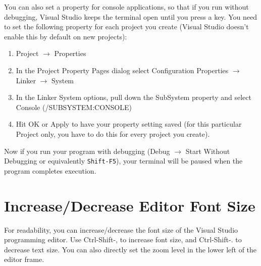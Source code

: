 \documentclass[11pt]{article}
\begin{document}
You can also set a property for console applications, so that if you
run without debugging, Visual Studio keeps the terminal open until
you press a key.  You need to set the following property for each
project you create (Visual Studio doesn't enable this by default
on new projects):

\begin{enumerate}
\item Project $\rightarrow$ Properties
\item In the Project Property Pages dialog select Configuration Properties $\rightarrow$ Linker $\rightarrow$ System
\item In the Linker System options, pull down the SubSystem property and select Console (/SUBSYSTEM:CONSOLE)
\item Hit OK or Apply to have your property setting saved (for this particular Project only, you have to do this for every project you create).
\end{enumerate}

Now if you run your program with debugging (Debug $\rightarrow$ Start
Without Debugging or equivalently \verb~Shift-F5~), your terminal will be
paused when the program completes execution.
\section{Increase/Decrease Editor Font Size}
\label{sec-5}

For readability, you can increase/decrease the font size of the Visual
Studio programming editor. Use Ctrl-Shift-, to increase font size,
and Ctrl-Shift-. to decrease text size.  You can also directly set
the zoom level in the lower left of the editor frame.
\end{document}
